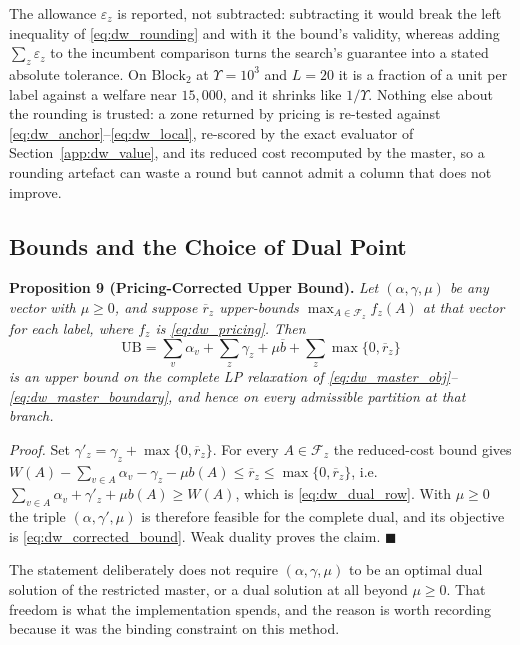 \documentclass{article}
\begin{document}
The allowance $\varepsilon_z$ is reported, not subtracted: subtracting it would
break the left inequality of \eqref{eq:dw_rounding} and with it the bound's
validity, whereas adding $\sum_z \varepsilon_z$ to the incumbent comparison
turns the search's guarantee into a stated absolute tolerance. On
$\text{Block}_2$ at $\Upsilon = 10^3$ and $L = 20$ it is a fraction of a unit
per label against a welfare near $15{,}000$, and it shrinks like $1/\Upsilon$.
Nothing else about the rounding is trusted: a zone returned by pricing is
re-tested against \eqref{eq:dw_anchor}--\eqref{eq:dw_local}, re-scored by the
exact evaluator of Section~\ref{app:dw_value}, and its reduced cost recomputed
by the master, so a rounding artefact can waste a round but cannot admit a
column that does not improve.

\subsection{Bounds and the Choice of Dual Point}
\label{app:dw_bounds}

\noindent\textbf{Proposition 9 (Pricing-Corrected Upper Bound).} \textit{Let
$(\alpha, \gamma, \mu)$ be \emph{any} vector with $\mu \geq 0$, and suppose
$\overline r_z$ upper-bounds $\max_{A \in \mathcal F_z} f_z(A)$ at that vector
for each label, where $f_z$ is \eqref{eq:dw_pricing}. Then}
\begin{equation}\label{eq:dw_corrected_bound}
\mathrm{UB}=\sum_v\alpha_v+\sum_z\gamma_z+\mu\overline b
              +\sum_z\max\{0,\overline r_z\}
\end{equation}
\textit{is an upper bound on the complete LP relaxation of
\eqref{eq:dw_master_obj}--\eqref{eq:dw_master_boundary}, and hence on every
admissible partition at that branch.}

\textit{Proof.} Set $\gamma'_z = \gamma_z + \max\{0, \overline r_z\}$. For every
$A \in \mathcal F_z$ the reduced-cost bound gives
$W(A) - \sum_{v \in A}\alpha_v - \gamma_z - \mu b(A) \leq \overline r_z \leq
\max\{0, \overline r_z\}$, i.e.\
$\sum_{v\in A}\alpha_v+\gamma'_z+\mu b(A)\geq W(A)$, which is
\eqref{eq:dw_dual_row}. With $\mu \geq 0$ the triple
$(\alpha, \gamma', \mu)$ is therefore feasible for the complete dual, and its
objective is \eqref{eq:dw_corrected_bound}. Weak duality proves the claim.
$\blacksquare$

The statement deliberately does not require $(\alpha, \gamma, \mu)$ to be an
optimal dual solution of the restricted master, or a dual solution at all
beyond $\mu \geq 0$. That freedom is what the implementation spends, and the
reason is worth recording because it was the binding constraint on this method.
\end{document}
